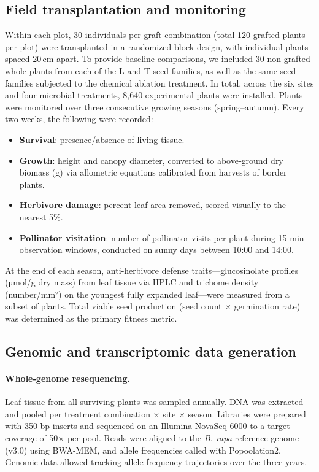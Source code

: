 \documentclass{article}
\begin{document}
\begin{itemize}
\subsection{Field transplantation and monitoring}
Within each plot, 30 individuals per graft combination (total 120 grafted plants per plot) were transplanted in a randomized block design, with individual plants spaced 20\,cm apart. To provide baseline comparisons, we included 30 non‑grafted whole plants from each of the L and T seed families, as well as the same seed families subjected to the chemical ablation treatment. In total, across the six sites and four microbial treatments, 8,640 experimental plants were installed. Plants were monitored over three consecutive growing seasons (spring–autumn). Every two weeks, the following were recorded:
\begin{itemize}
    \item \textbf{Survival}: presence/absence of living tissue.
    \item \textbf{Growth}: height and canopy diameter, converted to above‑ground dry biomass (g) via allometric equations calibrated from harvests of border plants.
    \item \textbf{Herbivore damage}: percent leaf area removed, scored visually to the nearest 5\%.
    \item \textbf{Pollinator visitation}: number of pollinator visits per plant during 15‑min observation windows, conducted on sunny days between 10:00 and 14:00.
\end{itemize}
At the end of each season, anti‑herbivore defense traits—glucosinolate profiles (µmol/g dry mass) from leaf tissue via HPLC and trichome density (number/mm²) on the youngest fully expanded leaf—were measured from a subset of plants. Total viable seed production (seed count × germination rate) was determined as the primary fitness metric.

\subsection{Genomic and transcriptomic data generation}
\paragraph{Whole‑genome resequencing.} Leaf tissue from all surviving plants was sampled annually. DNA was extracted and pooled per treatment combination \(\times\) site \(\times\) season. Libraries were prepared with 350 bp inserts and sequenced on an Illumina NovaSeq 6000 to a target coverage of 50\(\times\) per pool. Reads were aligned to the \textit{B. rapa} reference genome (v3.0) using BWA‑MEM, and allele frequencies called with Popoolation2. Genomic data allowed tracking allele frequency trajectories over the three years.

\end{itemize}
\end{document}
